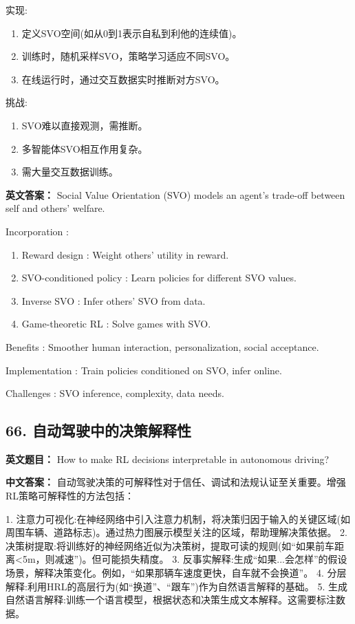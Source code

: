 \documentclass[10pt,a4paper]{ctexart}
\begin{document}
 实现:
\begin{enumerate}
    \item 定义SVO空间(如从0到1表示自私到利他的连续值)。
    \item 训练时，随机采样SVO，策略学习适应不同SVO。
    \item 在线运行时，通过交互数据实时推断对方SVO。
\end{enumerate}

 挑战:
\begin{enumerate}
    \item SVO难以直接观测，需推断。
    \item 多智能体SVO相互作用复杂。
    \item 需大量交互数据训练。
\end{enumerate}

\textbf{英文答案：}  
Social Value Orientation (SVO) models an agent's trade-off between self and others' welfare.

 Incorporation :
\begin{enumerate}
    \item Reward design : Weight others' utility in reward.
    \item SVO-conditioned policy : Learn policies for different SVO values.
    \item Inverse SVO : Infer others' SVO from data.
    \item Game-theoretic RL : Solve games with SVO.
\end{enumerate}

 Benefits : Smoother human interaction, personalization, social acceptance.

 Implementation : Train policies conditioned on SVO, infer online.

 Challenges : SVO inference, complexity, data needs.

\subsection*{66. 自动驾驶中的决策解释性}
\textbf{英文题目：} How to make RL decisions interpretable in autonomous driving?

\textbf{中文答案：}  
自动驾驶决策的可解释性对于信任、调试和法规认证至关重要。增强RL策略可解释性的方法包括：

1.  注意力可视化:在神经网络中引入注意力机制，将决策归因于输入的关键区域(如周围车辆、道路标志)。通过热力图展示模型关注的区域，帮助理解决策依据。
2.  决策树提取:将训练好的神经网络近似为决策树，提取可读的规则(如“如果前车距离<5m，则减速”)。但可能损失精度。
3.  反事实解释:生成“如果...会怎样”的假设场景，解释决策变化。例如，“如果那辆车速度更快，自车就不会换道”。
4.  分层解释:利用HRL的高层行为(如“换道”、“跟车”)作为自然语言解释的基础。
5.  生成自然语言解释:训练一个语言模型，根据状态和决策生成文本解释。这需要标注数据。
\end{document}
